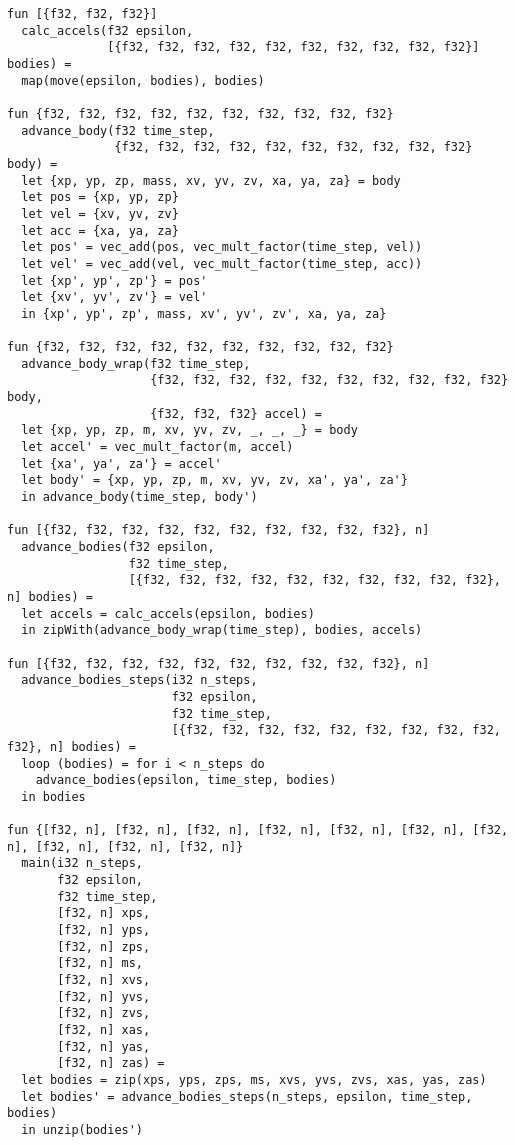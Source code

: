 \begin{lstlisting}
fun [{f32, f32, f32}]
  calc_accels(f32 epsilon,
              [{f32, f32, f32, f32, f32, f32, f32, f32, f32, f32}] bodies) =
  map(move(epsilon, bodies), bodies)

fun {f32, f32, f32, f32, f32, f32, f32, f32, f32, f32}
  advance_body(f32 time_step,
               {f32, f32, f32, f32, f32, f32, f32, f32, f32, f32} body) =
  let {xp, yp, zp, mass, xv, yv, zv, xa, ya, za} = body
  let pos = {xp, yp, zp}
  let vel = {xv, yv, zv}
  let acc = {xa, ya, za}
  let pos' = vec_add(pos, vec_mult_factor(time_step, vel))
  let vel' = vec_add(vel, vec_mult_factor(time_step, acc))
  let {xp', yp', zp'} = pos'
  let {xv', yv', zv'} = vel'
  in {xp', yp', zp', mass, xv', yv', zv', xa, ya, za}
  
fun {f32, f32, f32, f32, f32, f32, f32, f32, f32, f32}
  advance_body_wrap(f32 time_step,
                    {f32, f32, f32, f32, f32, f32, f32, f32, f32, f32} body,
                    {f32, f32, f32} accel) =
  let {xp, yp, zp, m, xv, yv, zv, _, _, _} = body
  let accel' = vec_mult_factor(m, accel)
  let {xa', ya', za'} = accel'
  let body' = {xp, yp, zp, m, xv, yv, zv, xa', ya', za'}
  in advance_body(time_step, body')
  
fun [{f32, f32, f32, f32, f32, f32, f32, f32, f32, f32}, n]
  advance_bodies(f32 epsilon,
                 f32 time_step,
                 [{f32, f32, f32, f32, f32, f32, f32, f32, f32, f32}, n] bodies) =
  let accels = calc_accels(epsilon, bodies)
  in zipWith(advance_body_wrap(time_step), bodies, accels)

fun [{f32, f32, f32, f32, f32, f32, f32, f32, f32, f32}, n]
  advance_bodies_steps(i32 n_steps,
                       f32 epsilon,
                       f32 time_step,
                       [{f32, f32, f32, f32, f32, f32, f32, f32, f32, f32}, n] bodies) =
  loop (bodies) = for i < n_steps do
    advance_bodies(epsilon, time_step, bodies)
  in bodies

fun {[f32, n], [f32, n], [f32, n], [f32, n], [f32, n], [f32, n], [f32, n], [f32, n], [f32, n], [f32, n]}
  main(i32 n_steps,
       f32 epsilon,
       f32 time_step,
       [f32, n] xps,
       [f32, n] yps,
       [f32, n] zps,
       [f32, n] ms,
       [f32, n] xvs,
       [f32, n] yvs,
       [f32, n] zvs,
       [f32, n] xas,
       [f32, n] yas,
       [f32, n] zas) =
  let bodies = zip(xps, yps, zps, ms, xvs, yvs, zvs, xas, yas, zas)
  let bodies' = advance_bodies_steps(n_steps, epsilon, time_step, bodies)
  in unzip(bodies')
\end{lstlisting}